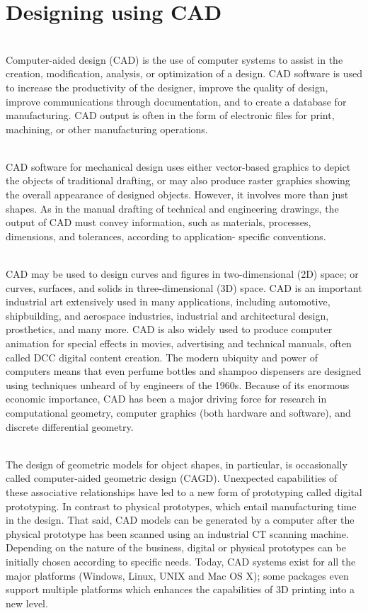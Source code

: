 \documentclass[12pt,a4paper]{report}
\begin{document}
	\section{Designing using CAD}
	\indent
	\\Computer-aided design (CAD) is the use of computer systems to assist in the creation,
	modification, analysis, or optimization of a design. CAD software is used to increase the
	productivity of the designer, improve the quality of design, improve communications through
	documentation, and to create a database for manufacturing. CAD output is often in the form of
	electronic files for print, machining, or other manufacturing operations.\par
	\indent
	\\CAD software for mechanical design uses either vector-based graphics to depict the objects of
	traditional drafting, or may also produce raster graphics showing the overall appearance of designed
	objects. However, it involves more than just shapes. As in the manual drafting of technical and
	engineering drawings, the output of CAD must convey information, such as materials, processes,
	dimensions, and tolerances, according to application- specific conventions.\par
	\indent
	\\CAD may be used to design curves and figures in two-dimensional (2D) space; or curves,
	surfaces, and solids in three-dimensional (3D) space. CAD is an important industrial art extensively
	used in many applications, including automotive, shipbuilding, and aerospace industries, industrial
	and architectural design, prosthetics, and many more. CAD is also widely used to produce computer
	animation for special effects in movies, advertising and technical manuals, often called DCC digital
	content creation. The modern ubiquity and power of computers means that even perfume bottles
	and shampoo dispensers are designed using techniques unheard of by engineers of the 1960s.
	Because of its enormous economic importance, CAD has been a major driving force for research in
	computational geometry, computer graphics (both hardware and software), and discrete differential
	geometry.\par
	\indent
	\\The design of geometric models for object shapes, in particular, is occasionally called
	computer-aided geometric design (CAGD). Unexpected capabilities of these associative
	relationships have led to a new form of prototyping called digital prototyping. In contrast to
	physical prototypes, which entail manufacturing time in the design. That said, CAD models can be
	generated by a computer after the physical prototype has been scanned using an industrial CT
	scanning machine. Depending on the nature of the business, digital or physical prototypes can be
	initially chosen according to specific needs. Today, CAD systems exist for all the major platforms
	(Windows, Linux, UNIX and Mac OS X); some packages even support multiple platforms which
	enhances the capabilities of 3D printing into a new level.\par
\end{document}
